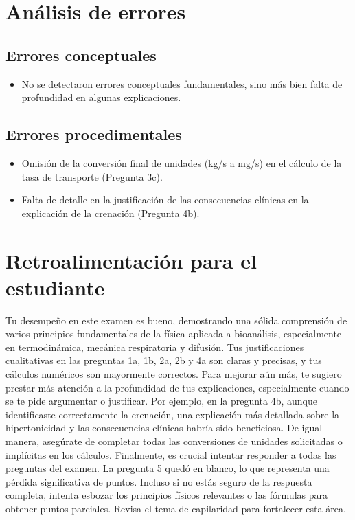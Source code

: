 \documentclass[11pt,a4paper]{article}
\begin{document}
\section*{Análisis de errores}

\subsection*{Errores conceptuales}
\begin{itemize}[leftmargin=1.5em, itemsep=2pt]
  \item No se detectaron errores conceptuales fundamentales, sino más bien falta de profundidad en algunas explicaciones.
\end{itemize}

\subsection*{Errores procedimentales}
\begin{itemize}[leftmargin=1.5em, itemsep=2pt]
  \item Omisión de la conversión final de unidades (kg/s a mg/s) en el cálculo de la tasa de transporte (Pregunta 3c).
  \item Falta de detalle en la justificación de las consecuencias clínicas en la explicación de la crenación (Pregunta 4b).
\end{itemize}

\section*{Retroalimentación para el estudiante}
\begin{tcolorbox}[cajaRecomendacion, title={Dirigido a: Ybianmaris Maribao}]
Tu desempeño en este examen es bueno, demostrando una sólida comprensión de varios principios fundamentales de la física aplicada a bioanálisis, especialmente en termodinámica, mecánica respiratoria y difusión. Tus justificaciones cualitativas en las preguntas 1a, 1b, 2a, 2b y 4a son claras y precisas, y tus cálculos numéricos son mayormente correctos. Para mejorar aún más, te sugiero prestar más atención a la profundidad de tus explicaciones, especialmente cuando se te pide argumentar o justificar. Por ejemplo, en la pregunta 4b, aunque identificaste correctamente la crenación, una explicación más detallada sobre la hipertonicidad y las consecuencias clínicas habría sido beneficiosa. De igual manera, asegúrate de completar todas las conversiones de unidades solicitadas o implícitas en los cálculos. Finalmente, es crucial intentar responder a todas las preguntas del examen. La pregunta 5 quedó en blanco, lo que representa una pérdida significativa de puntos. Incluso si no estás seguro de la respuesta completa, intenta esbozar los principios físicos relevantes o las fórmulas para obtener puntos parciales. Revisa el tema de capilaridad para fortalecer esta área.
\end{tcolorbox}
\end{document}
